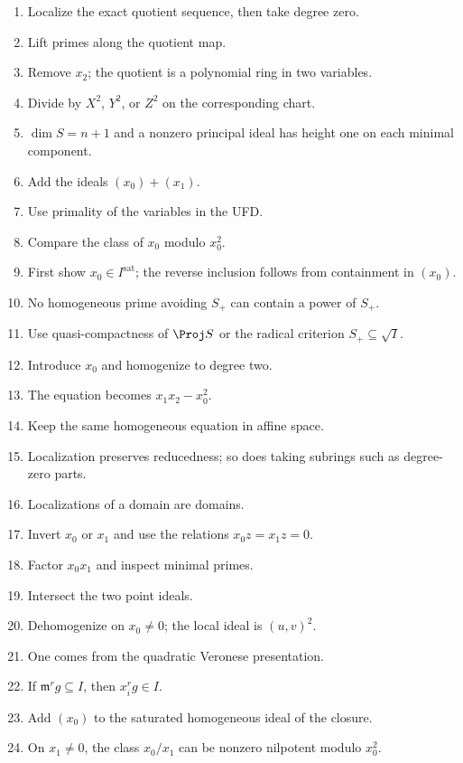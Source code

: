 \begin{enumerate}[label=\textbf{\arabic*.},leftmargin=*]
\item Localize the exact quotient sequence, then take degree zero.
\item Lift primes along the quotient map.
\item Remove \(x_2\); the quotient is a polynomial ring in two variables.
\item Divide by \(X^2\), \(Y^2\), or \(Z^2\) on the corresponding chart.
\item \(\dim S=n+1\) and a nonzero principal ideal has height one on each minimal component.
\item Add the ideals \((x_0)+(x_1)\).
\item Use primality of the variables in the UFD.
\item Compare the class of \(x_0\) modulo \(x_0^2\).
\item First show \(x_0\in I^{\mathrm{sat}}\); the reverse inclusion follows from containment in \((x_0)\).
\item No homogeneous prime avoiding \(S_+\) can contain a power of \(S_+\).
\item Use quasi-compactness of \(\Proj S\) or the radical criterion \(S_+\subseteq\sqrt I\).
\item Introduce \(x_0\) and homogenize to degree two.
\item The equation becomes \(x_1x_2-x_0^2\).
\item Keep the same homogeneous equation in affine space.
\item Localization preserves reducedness; so does taking subrings such as degree-zero parts.
\item Localizations of a domain are domains.
\item Invert \(x_0\) or \(x_1\) and use the relations \(x_0z=x_1z=0\).
\item Factor \(x_0x_1\) and inspect minimal primes.
\item Intersect the two point ideals.
\item Dehomogenize on \(x_0\ne0\); the local ideal is \((u,v)^2\).
\item One comes from the quadratic Veronese presentation.
\item If \(\mathfrak m^r g\subseteq I\), then \(x_i^r g\in I\).
\item Add \((x_0)\) to the saturated homogeneous ideal of the closure.
\item On \(x_1\ne0\), the class \(x_0/x_1\) can be nonzero nilpotent modulo \(x_0^2\).
\end{enumerate}
